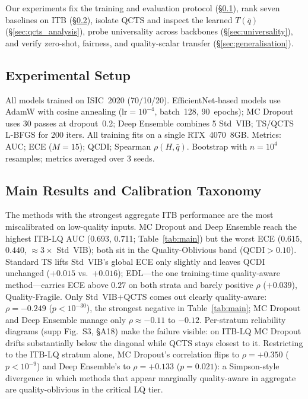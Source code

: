 \documentclass{bmvc2k}
\newcommand{\qbar}{\bar{q}}
\begin{document}
Our experiments fix the training and evaluation protocol (\S\ref{sec:setup}), rank seven baselines on ITB (\S\ref{sec:main_results}), isolate QCTS and inspect the learned $T(\qbar)$ (\S\ref{sec:qcts_analysis}), probe universality across backbones (\S\ref{sec:universality}), and verify zero-shot, fairness, and quality-scalar transfer (\S\ref{sec:generalisation}).

\subsection{Experimental Setup}
\label{sec:setup}

All models trained on ISIC~2020 (70/10/20). EfficientNet-based models use AdamW with cosine annealing ($\text{lr}{=}10^{-4}$, batch~128, 90~epochs); MC Dropout uses 30 passes at dropout~0.2; Deep Ensemble combines 5 Std~VIB; TS/QCTS L-BFGS for 200 iters. All training fits on a single RTX~4070~8GB. Metrics: AUC; ECE ($M{=}15$); QCDI; Spearman $\rho(H,\qbar)$. Bootstrap with $n{=}10^4$ resamples; metrics averaged over 3 seeds.

\subsection{Main Results and Calibration Taxonomy}
\label{sec:main_results}

The methods with the strongest aggregate ITB performance are the most miscalibrated on low-quality inputs. MC Dropout and Deep Ensemble reach the highest ITB-LQ AUC (0.693, 0.711; Table~\ref{tab:main}) but the worst ECE ($0.615$, $0.440$, ${\approx}3\times$ Std~VIB); both sit in the Quality-Oblivious band (QCDI${>}0.10$). Standard TS lifts Std~VIB's global ECE only slightly and leaves QCDI unchanged ($+0.015$ vs.\ $+0.016$); EDL---the one training-time quality-aware method---carries ECE above $0.27$ on both strata and barely positive $\rho$ ($+0.039$), Quality-Fragile. Only Std~VIB$+$QCTS comes out clearly quality-aware: $\rho{=}-0.249$ ($p{<}10^{-30}$), the strongest negative in Table~\ref{tab:main}; MC Dropout and Deep Ensemble manage only $\rho\approx-0.11$ to $-0.12$. Per-stratum reliability diagrams (supp Fig.~S3, \S A18) make the failure visible: on ITB-LQ MC Dropout drifts substantially below the diagonal while QCTS stays closest to it. Restricting to the ITB-LQ stratum alone, MC Dropout's correlation flips to $\rho{=}+0.350$ ($p{<}10^{-9}$) and Deep Ensemble's to $\rho{=}+0.133$ ($p{=}0.021$): a Simpson-style divergence in which methods that appear marginally quality-aware in aggregate are quality-oblivious in the critical LQ tier.
\end{document}
